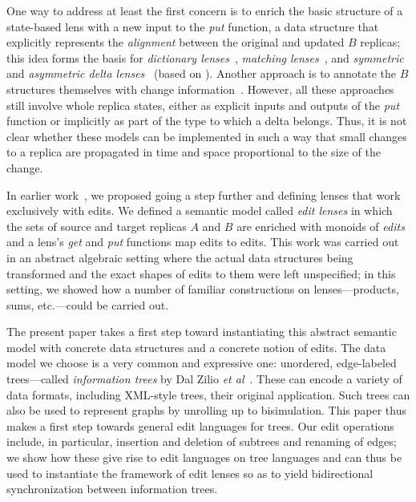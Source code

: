 One way to address at least the first concern is to enrich the basic
structure of a state-based lens with a new input to the {\em put} function,
a data structure that explicitly represents the {\em alignment} between the
original and updated $B$ replicas; this idea forms the basis for {\em
  dictionary lenses}~\cite{Boomerang07}, {\em matching
  lenses}~\cite{Matching10}, and {\em symmetric}~\cite{Diskin-Delta11} and
{\em asymmetric delta lenses}~\cite{diskin2011asymmetric} (based on
\cite{Stevens07}).  Another approach is to annotate the $B$ structures themselves with
change information~\cite{HuModels07, Hidaka10}.  However, all these
approaches still involve whole replica states, either as explicit inputs and
outputs of the {\em put} function or implicitly as part of the type to which
a delta belongs.  Thus, it is not clear whether these models can be
implemented in such a way that small changes to a replica are propagated in
time and space proportional to the size of the change.


In earlier work~\cite{HofmannPierceWagner12}, we proposed going a step further and defining
lenses that work exclusively with edits.  We defined a semantic model called
{\em edit lenses} in which the sets of source and target replicas $A$ and
$B$ are enriched with monoids of {\em edits} and a lens's {\em get} and {\em
  put} functions map edits to edits.  This work was carried out in an
abstract algebraic setting where the actual data structures being
transformed and the exact shapes of edits to them were left unspecified; in
this setting, we showed how a number of familiar constructions on
lenses---products, sums, etc.---could be carried out.

The present paper takes a first step
toward instantiating this abstract semantic
model with concrete data structures and a concrete notion of edits.  The
data model we choose is a very common and expressive one: unordered,
edge-labeled trees---called {\em information trees} by Dal Zilio {\em et
  al}~\cite{DalzilioS:POPL04}. These can encode a variety of data formats,
including XML-style trees, their original application.
Such trees can also be used to represent graphs
\cite{UnQL96,Hidaka10} by unrolling up to bisimulation. This paper thus
makes a first step towards general edit languages for trees.  Our edit
operations include, in particular, insertion and deletion of subtrees and
renaming of edges; we show how these give rise to edit languages on tree
languages and can thus be used to instantiate the framework of {edit
  lenses} so as to yield bidirectional synchronization between information
trees.

